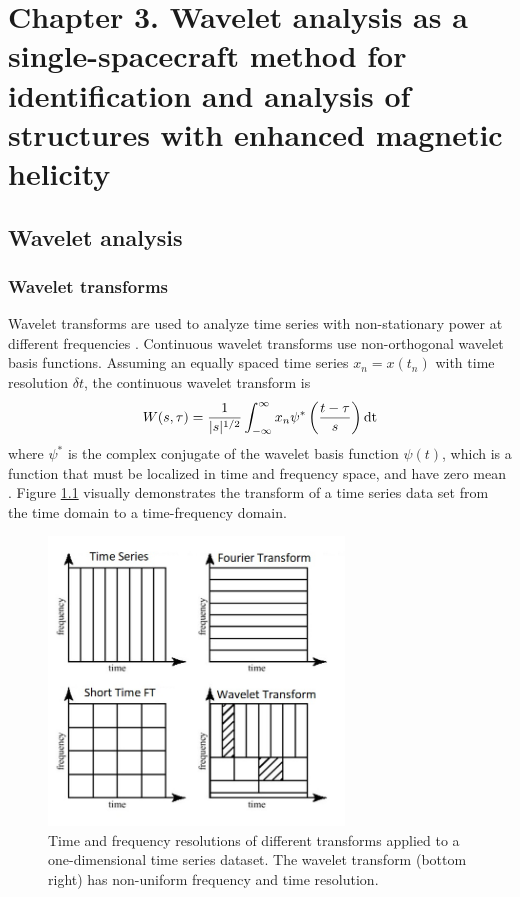 \chapter{Chapter 3. Wavelet analysis as a single-spacecraft method for identification and analysis of structures with enhanced magnetic helicity}

\section{Wavelet analysis}
%

\subsection{Wavelet transforms}
Wavelet transforms are used to analyze time series with non-stationary power at different frequencies \cite{Torrence:1998}. Continuous wavelet transforms use non-orthogonal wavelet basis functions. Assuming  an equally spaced time series $x_n=x(t_n)$ with time resolution $\delta t$, the continuous wavelet transform is
\begin{equation}
    W(s,\tau) = \frac{1}{|s|^{1/2}}\int_{-\infty}^\infty x_n\psi^*\left( \frac{t-\tau}{s} \right)\textnormal{dt}
    \label{wavetrans}
\end{equation}
where $\psi^*$ is the complex conjugate of the wavelet basis function $\psi(t)$, which is a function that must be localized in time and frequency space, and have zero mean \cite{Torrence:1998}. Figure \ref{fig:wavelet-diagram} visually demonstrates the transform of a time series data set from the time domain to a time-frequency domain.

\begin{figure}[h!]
    \centering
    \includegraphics[width=0.7\textwidth]{Figures/Comparisonoftransformations.jpeg}
    \caption[Time and frequency resolutions of different transforms]{Time and frequency resolutions of different transforms applied to a one-dimensional time series dataset. The wavelet transform (bottom right) has non-uniform frequency and time resolution.}
    \label{fig:wavelet-diagram}
\end{figure}

